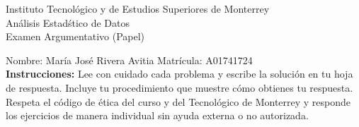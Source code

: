 \documentclass[10pt]{report}
\begin{document}
\newpage



\begin{center}
{\large Instituto Tecnol\'{o}gico y de Estudios Superiores de Monterrey \\
An\'alisis Estad\'stico de Datos } \\
Examen Argumentativo (Papel)
\end{center}

Nombre: \underline{\hspace*{.2in}}
Mar\'ia Jos\'e Rivera Avitia
\underline{\hspace*{.2in}} \quad Matr\'icula:\underline{\hspace*{.2in}}
A01741724
\underline{\hspace*{.2in}} \\

{\bf Instrucciones:} Lee con cuidado cada problema y escribe la soluci\'on
en tu hoja de respuesta. Incluye tu procedimiento que muestre c\'omo obtienes tu respuesta.  Respeta el c\'odigo de \'etica del curso y del Tecnol\'ogico de Monterrey y responde los ejercicios de manera individual sin ayuda externa o no autorizada.
\end{document}
